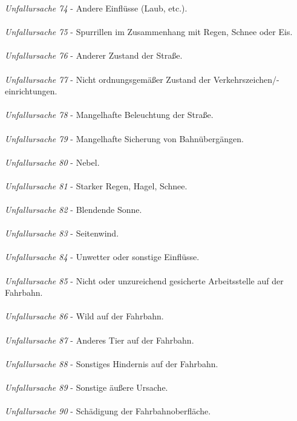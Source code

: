 \textit{Unfallursache 74} - Andere Einflüsse (Laub, etc.).\\
\\
\textit{Unfallursache 75} - Spurrillen im Zusammenhang mit Regen, Schnee oder Eis.\\
\\
\textit{Unfallursache 76} - Anderer Zustand der Straße.\\
\\
\textit{Unfallursache 77} - Nicht ordnungsgemäßer Zustand der Verkehrszeichen/-einrichtungen.\\
\\
\textit{Unfallursache 78} - Mangelhafte Beleuchtung der Straße.\\
\\
\textit{Unfallursache 79} - Mangelhafte Sicherung von Bahnübergängen.\\
\\
\textit{Unfallursache 80} - Nebel.\\
\\
\textit{Unfallursache 81} - Starker Regen, Hagel, Schnee.\\
\\
\textit{Unfallursache 82} - Blendende Sonne.\\
\\
\textit{Unfallursache 83} - Seitenwind.\\
\\
\textit{Unfallursache 84} - Unwetter oder sonstige Einflüsse.\\
\\
\textit{Unfallursache 85} - Nicht oder unzureichend gesicherte Arbeitsstelle auf der Fahrbahn.\\
\\
\textit{Unfallursache 86} - Wild auf der Fahrbahn.\\
\\
\textit{Unfallursache 87} - Anderes Tier auf der Fahrbahn.\\
\\
\textit{Unfallursache 88} - Sonstiges Hindernis auf der Fahrbahn.\\
\\
\textit{Unfallursache 89} - Sonstige äußere Ursache.\\
\\
\textit{Unfallursache 90} - Schädigung der Fahrbahnoberfläche.\\